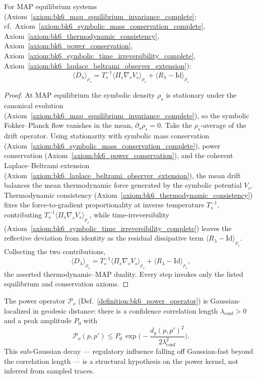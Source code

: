 \begin{theorem}
\label{theorem:bk6_thermodynamic_map_duality}
For MAP equilibrium systems (Axiom~\ref{axiom:bk6_map_equilibrium_invariance_complete}; cf.~Axiom~\ref{axiom:bk6_symbolic_mass_conservation_complete}, Axiom~\ref{axiom:bk6_thermodynamic_consistency}, Axiom~\ref{axiom:bk6_power_conservation}, Axiom~\ref{axiom:bk6_symbolic_time_irreversibility_complete}, Axiom~\ref{axiom:bk6_laplace_beltrami_observer_extension}):
\begin{equation}
\langle D_\lambda \rangle_{\rho_s} = T_s^{-1} \langle \Pi_s \nabla_s V_s \rangle_{\rho_s} + \langle R_\lambda - \text{Id} \rangle_{\rho_s}
\end{equation}
\end{theorem}
\begin{proof}
\label{proof:bk6_thermodynamic_map_duality}
\leavevmode
At MAP equilibrium the symbolic density $\rho_s$ is stationary under the canonical evolution (Axiom~\ref{axiom:bk6_map_equilibrium_invariance_complete}), so the symbolic Fokker--Planck flow vanishes in the mean, $\partial_s\rho_s=0$. Take the $\rho_s$-average of the drift operator. Using stationarity with symbolic mass conservation (Axiom~\ref{axiom:bk6_symbolic_mass_conservation_complete}), power conservation (Axiom~\ref{axiom:bk6_power_conservation}), and the coherent Laplace--Beltrami extension (Axiom~\ref{axiom:bk6_laplace_beltrami_observer_extension}), the mean drift balances the mean thermodynamic force generated by the symbolic potential $V_s$. Thermodynamic consistency (Axiom~\ref{axiom:bk6_thermodynamic_consistency}) fixes the force-to-gradient proportionality at inverse temperature $T_s^{-1}$, contributing $T_s^{-1}\langle\Pi_s\nabla_s V_s\rangle_{\rho_s}$, while time-irreversibility (Axiom~\ref{axiom:bk6_symbolic_time_irreversibility_complete}) leaves the reflective deviation from identity as the residual dissipative term $\langle R_\lambda-\mathrm{Id}\rangle_{\rho_s}$. Collecting the two contributions,
\[
\langle D_\lambda\rangle_{\rho_s}=T_s^{-1}\langle\Pi_s\nabla_s V_s\rangle_{\rho_s}+\langle R_\lambda-\mathrm{Id}\rangle_{\rho_s},
\]
the asserted thermodynamic--MAP duality. Every step invokes only the listed equilibrium and conservation axioms.
\end{proof}

\begin{assumption}
\label{assumption:bk6_gaussian_locality}
The power operator $\mathcal{P}_\nu$ (Def.~\ref{definition:bk6_power_operator}) is Gaussian-localized in geodesic distance: there is a confidence correlation length $\lambda_{\text{conf}}>0$ and a peak amplitude $P_0$ with
\[
\mathcal{P}_\nu(p,p')\le P_0\,\exp\!\Big(-\frac{d_g(p,p')^2}{2\lambda_{\text{conf}}^2}\Big).
\]
This sub-Gaussian decay --- regulatory influence falling off Gaussian-fast beyond the correlation length --- is a structural hypothesis on the power kernel, not inferred from sampled traces.
\end{assumption}

